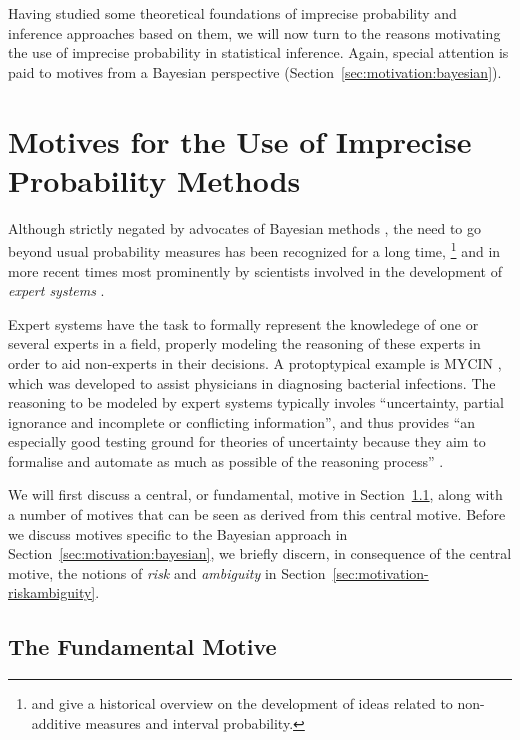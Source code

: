 Having studied some theoretical foundations of imprecise probability 
and inference approaches based on them,
we will now turn to the reasons motivating the use of imprecise probability in statistical inference.
Again, special attention is paid to motives from a Bayesian perspective
(Section~\ref{sec:motivation:bayesian}).


\section{Motives for the Use of Imprecise Probability Methods}
\label{sec:motivation}

Although strictly negated by advocates of Bayesian methods \parencite[e.g., by][]{1987:lindley},
the need to go beyond usual probability measures has been recognized for a long time,%
\footnote{\textcite{2009:hampel} and \textcite[\S 1]{2001:weichselberger} give a historical overview on the development of
ideas related to non-additive measures and interval probability.}
and in more recent times most prominently by scientists involved in the development of \emph{expert systems}
\parencite[see, e.g.,][]{1996:walley::expert}.%

Expert systems have the task to formally represent the knowledege of one or several experts in a field,
properly modeling the reasoning of these experts in order to aid non-experts in their decisions.
A protoptypical example is MYCIN \parencite{1976:shortliffe},
which was developed to assist physicians in diagnosing bacterial infections.
The reasoning to be modeled by expert systems typically involes
``uncertainty, partial ignorance and incomplete or conflicting information'', and thus provides
``an especially good testing ground for theories of uncertainty
because they aim to formalise and automate as much as possible
of the reasoning process'' \parencite[p.~2]{1996:walley::expert}.

We will first discuss a central, or fundamental, motive in Section~\ref{sec:motivation-fundamental},
along with a number of motives that can be seen as derived from this central motive.
Before we discuss motives specific to the Bayesian approach in Section~\ref{sec:motivation:bayesian},
we briefly discern, in consequence of the central motive, the notions of \emph{risk} and \emph{ambiguity}
in Section~\ref{sec:motivation-riskambiguity}.

\subsection{The Fundamental Motive}
\label{sec:motivation-fundamental}

